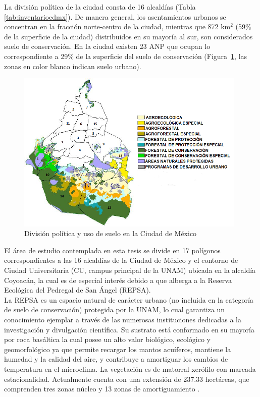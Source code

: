 La división política de la ciudad consta de 16 alcaldías (Tabla \ref{tab:inventariocdmx}). De manera general, los asentamientos urbanos se concentran en la fracción norte-centro de la ciudad, mientras que 872 km$^{2}$ (59$\%$ de la superficie de la ciudad) distribuidos en su mayoría al sur, son considerados suelo de conservación. En la ciudad existen 23 ANP que ocupan lo correspondiente a 29$\%$ de la superficie del suelo de conservación \citep{SEDEMA2016} (Figura~\ref{ciudaddemexico}, las zonas en color blanco indican suelo urbano).\\

\begin{figure}[htb]
  \centering
    \includegraphics[width=110mm,scale=1]{ciudaddemexico}
  \caption{División política y uso de suelo en la Ciudad de México \citep{SEDEMA2016}}
  \label{ciudaddemexico}
\end{figure}

\newpage

El área de estudio contemplada en esta tesis se divide en 17 polígonos correspondientes a las 16 alcaldías de la Ciudad de México y el contorno de Ciudad Universitaria (CU, campus principal de la UNAM) ubicada en la alcaldía Coyoacán, la cual es de especial interés debido a que alberga a la Reserva Ecológica del Pedregal de San Ángel (REPSA).\\

La REPSA es un espacio natural de carácter urbano (no incluida en la categoría de suelo de conservación) protegida por la UNAM, lo cual garantiza un conocimiento ejemplar a través de las numerosas instituciones dedicadas a la investigación y divulgación científica. Su sustrato está conformado en su mayoría por roca basáltica la cual posee un alto valor biológico, ecológico y geomorfológico ya que permite recargar los mantos acuíferos, mantiene la humedad y la calidad del aire, y contribuye a amortiguar los cambios de temperatura en el microclima. La vegetación es de matorral xerófilo con marcada estacionalidad. Actualmente cuenta con una extensión de 237.33 hectáreas, que comprenden tres zonas núcleo y 13 zonas de amortiguamiento \citep{REPSA2019}.\\

